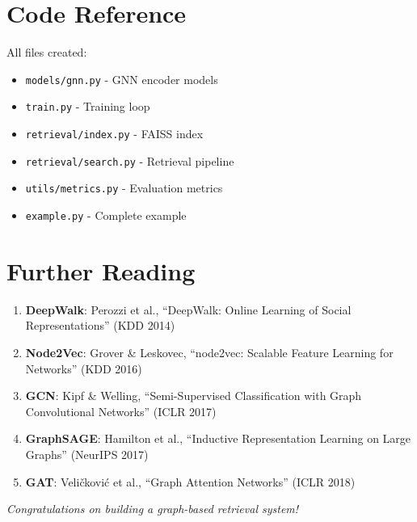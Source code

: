 \documentclass[12pt,a4paper]{article}
\begin{document}
\section{Code Reference}

All files created:
\begin{itemize}
    \item \texttt{models/gnn.py} - GNN encoder models
    \item \texttt{train.py} - Training loop
    \item \texttt{retrieval/index.py} - FAISS index
    \item \texttt{retrieval/search.py} - Retrieval pipeline
    \item \texttt{utils/metrics.py} - Evaluation metrics
    \item \texttt{example.py} - Complete example
\end{itemize}

\section{Further Reading}

\begin{enumerate}
    \item \textbf{DeepWalk}: Perozzi et al., ``DeepWalk: Online Learning of Social Representations'' (KDD 2014)
    \item \textbf{Node2Vec}: Grover \& Leskovec, ``node2vec: Scalable Feature Learning for Networks'' (KDD 2016)
    \item \textbf{GCN}: Kipf \& Welling, ``Semi-Supervised Classification with Graph Convolutional Networks'' (ICLR 2017)
    \item \textbf{GraphSAGE}: Hamilton et al., ``Inductive Representation Learning on Large Graphs'' (NeurIPS 2017)
    \item \textbf{GAT}: Veli\v{c}kovi\'c et al., ``Graph Attention Networks'' (ICLR 2018)
\end{enumerate}

\vspace{2cm}
\begin{center}
\textit{Congratulations on building a graph-based retrieval system!}
\end{center}
\end{document}
